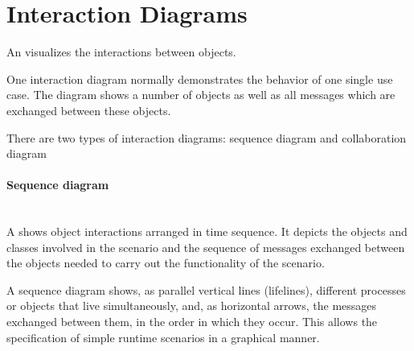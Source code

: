 \begin{minipage}[c]{0.45\linewidth}
\newpage
\section{Interaction Diagrams}
An  visualizes the interactions between
objects.

One interaction diagram normally demonstrates the behavior of one
single use case. The diagram shows a number of objects as well as
all messages which are exchanged between these objects.

There are two types of interaction diagrams:
sequence diagram and collaboration diagram

%
\paragraph{Sequence diagram}\mbox{} \\
A  shows object interactions arranged in time sequence.
It depicts the objects and classes involved in the scenario and the sequence
of messages exchanged between the objects needed to carry out the
functionality of the scenario.

A sequence diagram shows, as parallel vertical lines (lifelines),
different processes or objects that live simultaneously, and, as
horizontal arrows, the messages exchanged between them, in the order in
which they occur. This allows the specification of simple runtime scenarios
in a graphical manner.


%
%


\end{minipage}
